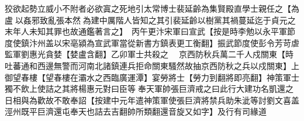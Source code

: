 狡欲起勢立威小不附者必欲寘之死地引太常博士裴延齡為集賢殿直學士親任之【為盧以姦邪致亂張本然為建中厲階人皆知之其引裴延齡以樹黨其禍蔓延迄于貞元之末年人未知其罪也故通鑑著言之】　丙午更汴宋軍曰宣武【按是時李勉以永平軍節度使鎮汴州盖以宋亳潁為宣武軍當從新書方鎮表更工衡翻】振武節度使彭令芳苛虐監軍劉惠光貪婪【婪盧含翻】乙卯軍士共殺之　京西防秋兵萬二千人戍關東【時吐蕃通和西邊無警而河南北諸鎮連兵拒命關東騷然故抽京西防秋之兵以戍關東】上御望春樓【望春樓在灞水之西臨廣運潭】宴勞將士【勞力到翻將即亮翻】神策軍士獨不飲上使詰之其將楊惠元對曰臣等奉天軍帥張巨濟戒之曰此行大建功名凱還之日相與為歡故不敢奉詔【按建中元年遣神策軍使張巨濟將禁兵助朱泚等討劉文喜盖涇州既平巨濟還屯奉天也詰去吉翻帥所類翻還音旋又如字】及行有司緣道